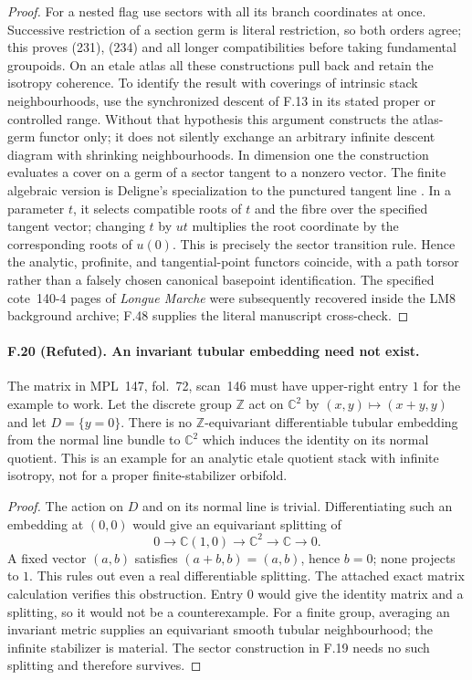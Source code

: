\begin{proof}
For a nested flag use sectors with all its branch coordinates at once.
Successive restriction of a section germ is literal restriction, so
both orders agree; this proves (231), (234) and all longer
compatibilities before taking fundamental groupoids. On an etale
atlas all these constructions pull back and retain the isotropy
coherence. To identify the result with coverings of intrinsic stack
neighbourhoods, use the synchronized descent of F.13 in its stated
proper or controlled range. Without that hypothesis this argument
constructs the atlas-germ functor only; it does not silently exchange
an arbitrary infinite descent diagram with shrinking neighbourhoods.
In dimension one the construction evaluates a cover on a germ of a
sector tangent to a nonzero vector. The finite algebraic version is
Deligne's specialization to the punctured tangent line
\cite[\S15.13--15.27]{Deligne1989}. In a parameter $t$, it selects
compatible roots of $t$ and the fibre over the specified tangent
vector; changing $t$ by $u t$ multiplies the root coordinate by the
corresponding roots of $u(0)$. This is precisely the sector transition
rule. Hence the analytic, profinite, and tangential-point functors
coincide, with a path torsor rather than a falsely chosen canonical
basepoint identification. The specified cote~140-4 pages of
\emph{Longue Marche} were subsequently recovered inside the LM8
background archive; F.48 supplies the literal manuscript cross-check.
\end{proof}

\paragraph{F.20 (Refuted). An invariant tubular
embedding need not exist.}
The matrix in MPL~147, fol.~72, scan~146 must have upper-right entry
$1$ for the example to work. Let the discrete group $\mathbb Z$ act
on $\mathbb C^2$ by $(x,y)\mapsto(x+y,y)$ and let $D=\{y=0\}$.
There is no $\mathbb Z$-equivariant differentiable tubular embedding
from the normal line bundle to $\mathbb C^2$ which induces the
identity on its normal quotient. This is an example for an analytic
etale quotient stack with infinite isotropy, not for a proper
finite-stabilizer orbifold.

\begin{proof}
The action on $D$ and on its normal line is trivial. Differentiating
such an embedding at $(0,0)$ would give an equivariant splitting of
\[
 0\longrightarrow\mathbb C(1,0)\longrightarrow\mathbb C^2
       \longrightarrow\mathbb C\longrightarrow0.
\]
A fixed vector $(a,b)$ satisfies $(a+b,b)=(a,b)$, hence $b=0$;
none projects to $1$. This rules out even a real differentiable
splitting. The attached exact matrix calculation verifies this
obstruction. Entry $0$ would give the identity matrix and a splitting,
so it would not be a counterexample. For a finite group, averaging
an invariant metric supplies an equivariant smooth tubular
neighbourhood; the infinite stabilizer is material. The sector
construction in F.19 needs no such splitting and therefore survives.
\end{proof}

